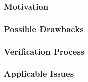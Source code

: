 \subsubsection*{Motivation}

\subsubsection*{Possible Drawbacks}

\subsubsection*{Verification Process}

\subsubsection*{Applicable Issues}